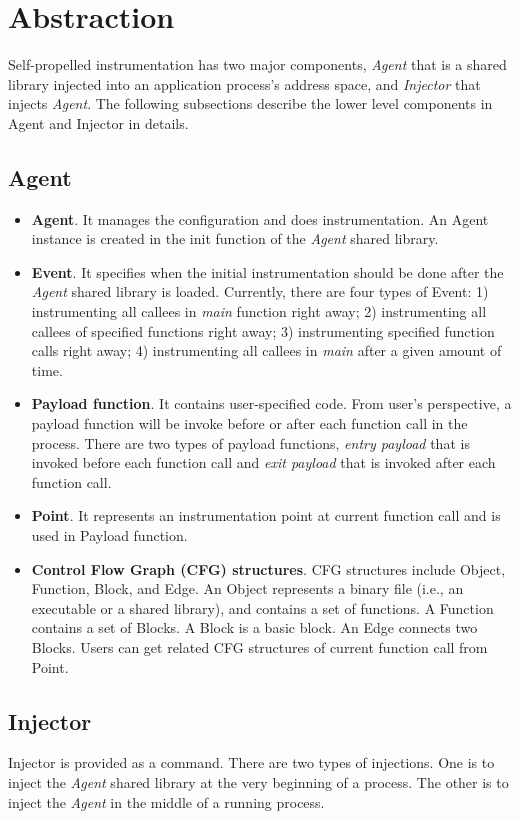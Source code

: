 \section{Abstraction}
Self-propelled instrumentation has two major components, {\em Agent} that is a
shared library injected into an application process's address space, and {\em
  Injector} that injects {\em Agent}.
The following subsections describe the lower level components in Agent and
Injector in details.

\subsection{Agent}

\begin{itemize}
\item \textbf{Agent}. It manages the configuration and does instrumentation. An
  Agent instance is created in the init function of the {\em Agent} shared
  library.
\item \textbf{Event}. It specifies when the initial instrumentation should be
  done after the {\em Agent} shared library is loaded.  Currently, there are
  four types of Event: 1) instrumenting all callees in {\em main} function right
  away; 2) instrumenting all callees of specified functions right away; 3)
  instrumenting specified function calls right away; 4) instrumenting all
  callees in {\em main} after a given amount of time.
\item \textbf{Payload function}. It contains user-specified code.  From user's
  perspective, a payload function will be invoke before or after each function
  call in the process.  There are two types of payload functions, {\em entry
    payload} that is invoked before each function call and {\em exit payload}
  that is invoked after each function call.
\item \textbf{Point}. It represents an instrumentation point at current function
  call and is used in Payload function.
\item \textbf{Control Flow Graph (CFG) structures}. CFG structures include
  Object, Function, Block, and Edge. An Object represents a binary file (i.e.,
  an executable or a shared library), and contains a set of functions. A
  Function contains a set of Blocks. A Block is a basic block. An Edge connects
  two Blocks. Users can get related CFG structures of current function call from
  Point.
\end{itemize}





\subsection{Injector}

Injector is provided as a command. 
There are two types of injections.
One is to inject the {\em Agent} shared library at the very beginning of a
process.
The other is to inject the {\em Agent} in the middle of a running process.



